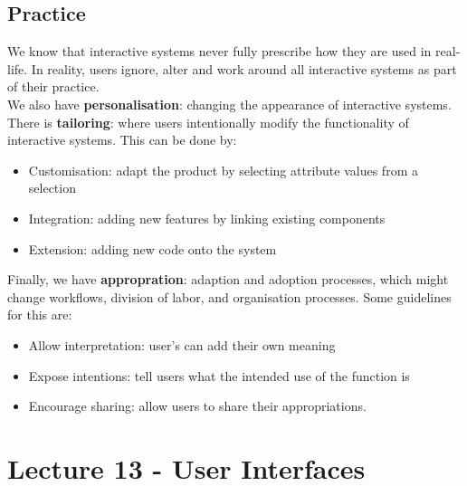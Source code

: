 \documentclass{article}
\begin{document}
\subsection{Practice}
We know that interactive systems never fully prescribe how they are used in real-life. In reality, users ignore, alter and work around all interactive systems as part of their practice. \\
We also have \textbf{personalisation}: changing the appearance of interactive systems. \\
There is \textbf{tailoring}: where users intentionally modify the functionality of interactive systems. This can be done by:
\begin{itemize}
    \item Customisation: adapt the product by selecting attribute values from a selection
    \item Integration: adding new features by linking existing components
    \item Extension: adding new code onto the system
\end{itemize}
Finally, we have \textbf{appropration}: adaption and adoption processes, which might change workflows, division of labor, and organisation processes. Some guidelines for this are:
\begin{itemize}
    \item Allow interpretation: user's can add their own meaning
    \item Expose intentions: tell users what the intended use of the function is
    \item Encourage sharing: allow users to share their appropriations.
\end{itemize}
\section{Lecture 13 - User Interfaces}
\end{document}
